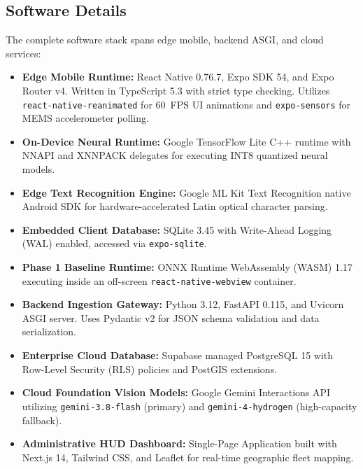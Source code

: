 \documentclass[12pt,a4paper,oneside]{report}
\begin{document}
\subsection{Software Details}
The complete software stack spans edge mobile, backend ASGI, and cloud services:
\begin{itemize}
    \item \textbf{Edge Mobile Runtime:} React Native 0.76.7, Expo SDK 54, and Expo Router v4. Written in TypeScript 5.3 with strict type checking. Utilizes \texttt{react-native-reanimated} for 60~FPS UI animations and \texttt{expo-sensors} for MEMS accelerometer polling.
    \item \textbf{On-Device Neural Runtime:} Google TensorFlow Lite C++ runtime with NNAPI and XNNPACK delegates for executing INT8 quantized neural models.
    \item \textbf{Edge Text Recognition Engine:} Google ML Kit Text Recognition native Android SDK for hardware-accelerated Latin optical character parsing.
    \item \textbf{Embedded Client Database:} SQLite 3.45 with Write-Ahead Logging (WAL) enabled, accessed via \texttt{expo-sqlite}.
    \item \textbf{Phase 1 Baseline Runtime:} ONNX Runtime WebAssembly (WASM) 1.17 executing inside an off-screen \texttt{react-native-webview} container.
    \item \textbf{Backend Ingestion Gateway:} Python 3.12, FastAPI 0.115, and Uvicorn ASGI server. Uses Pydantic v2 for JSON schema validation and data serialization.
    \item \textbf{Enterprise Cloud Database:} Supabase managed PostgreSQL 15 with Row-Level Security (RLS) policies and PostGIS extensions.
    \item \textbf{Cloud Foundation Vision Models:} Google Gemini Interactions API utilizing \texttt{gemini-3.8-flash} (primary) and \texttt{gemini-4-hydrogen} (high-capacity fallback).
    \item \textbf{Administrative HUD Dashboard:} Single-Page Application built with Next.js 14, Tailwind CSS, and Leaflet for real-time geographic fleet mapping.
\end{itemize}
\end{document}

